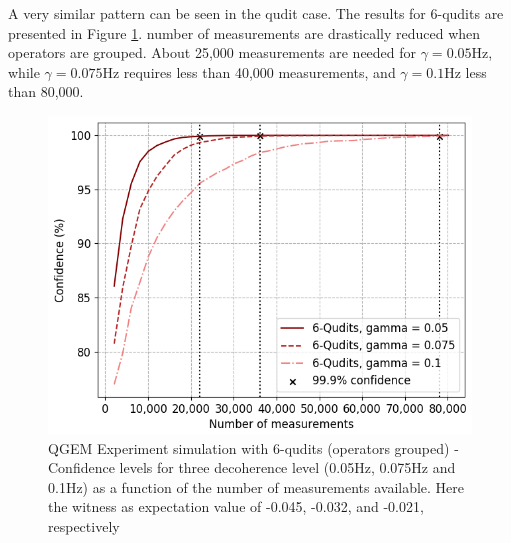 \documentclass[%
 reprint,
 superscriptaddress,
 amsmath,
 amssymb,
 aps,
 longbibliography
]{revtex4-2}
\begin{document}
\indent A very similar pattern can be seen in the qudit case. The results for 6-qudits are presented in Figure \ref{fig:expsim_6qudits_grouped}. number of measurements are drastically reduced when operators are grouped. About 25,000 measurements are needed for $\gamma = 0.05$Hz, while $\gamma = 0.075$Hz requires less than 40,000 measurements, and $\gamma = 0.1$Hz less than 80,000.
	\begin{figure}
    	\includegraphics[width=1.\columnwidth]{EW_confidence_6qudits_grouped.png}\par\medskip
	    \caption{QGEM Experiment simulation with 6-qudits (operators grouped) - Confidence levels for three decoherence level (0.05Hz, 0.075Hz and 0.1Hz) as a function of the number of measurements available. Here the witness as expectation value of -0.045, -0.032, and -0.021, respectively} \label{fig:expsim_6qudits_grouped}
	\end{figure} 
\end{document}
